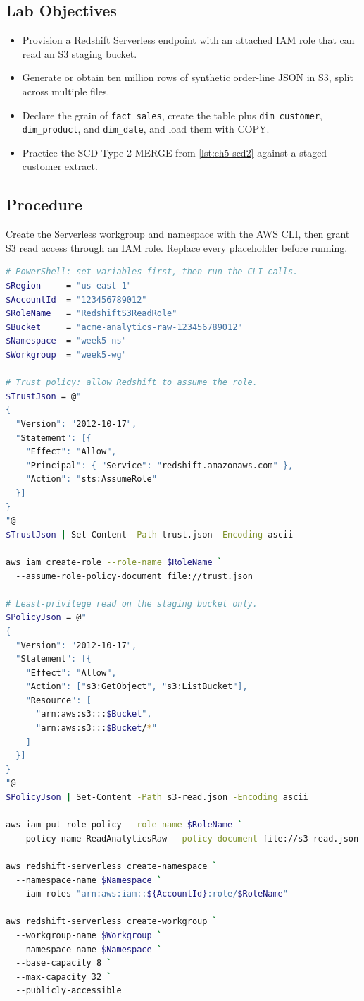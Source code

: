 \subsection*{Lab Objectives}
\begin{itemize}
    \item Provision a Redshift Serverless endpoint with an attached IAM role that can read an S3 staging bucket.
    \item Generate or obtain ten million rows of synthetic order-line JSON in S3, split across multiple files.
    \item Declare the grain of \texttt{fact\_sales}, create the table plus \texttt{dim\_customer}, \texttt{dim\_product}, and \texttt{dim\_date}, and load them with COPY.
    \item Practice the SCD Type 2 MERGE from \cref{lst:ch5-scd2} against a staged customer extract.
\end{itemize}

\subsection*{Procedure}
Create the Serverless workgroup and namespace with the AWS CLI, then grant S3 read access through an IAM role. Replace every placeholder before running.

\begin{lstlisting}[language=bash,caption={Provisioning a Redshift Serverless workgroup with an IAM role.},label={lst:ch5-serverless-setup}]
# PowerShell: set variables first, then run the CLI calls.
$Region     = "us-east-1"
$AccountId  = "123456789012"
$RoleName   = "RedshiftS3ReadRole"
$Bucket     = "acme-analytics-raw-123456789012"
$Namespace  = "week5-ns"
$Workgroup  = "week5-wg"

# Trust policy: allow Redshift to assume the role.
$TrustJson = @"
{
  "Version": "2012-10-17",
  "Statement": [{
    "Effect": "Allow",
    "Principal": { "Service": "redshift.amazonaws.com" },
    "Action": "sts:AssumeRole"
  }]
}
"@
$TrustJson | Set-Content -Path trust.json -Encoding ascii

aws iam create-role --role-name $RoleName `
  --assume-role-policy-document file://trust.json

# Least-privilege read on the staging bucket only.
$PolicyJson = @"
{
  "Version": "2012-10-17",
  "Statement": [{
    "Effect": "Allow",
    "Action": ["s3:GetObject", "s3:ListBucket"],
    "Resource": [
      "arn:aws:s3:::$Bucket",
      "arn:aws:s3:::$Bucket/*"
    ]
  }]
}
"@
$PolicyJson | Set-Content -Path s3-read.json -Encoding ascii

aws iam put-role-policy --role-name $RoleName `
  --policy-name ReadAnalyticsRaw --policy-document file://s3-read.json

aws redshift-serverless create-namespace `
  --namespace-name $Namespace `
  --iam-roles "arn:aws:iam::${AccountId}:role/$RoleName"

aws redshift-serverless create-workgroup `
  --workgroup-name $Workgroup `
  --namespace-name $Namespace `
  --base-capacity 8 `
  --max-capacity 32 `
  --publicly-accessible
\end{lstlisting}

